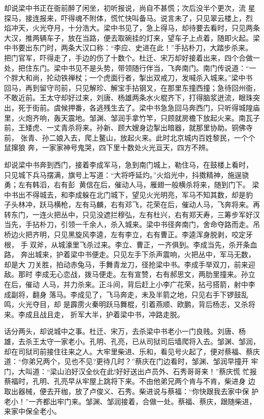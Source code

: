 却说梁中书正在衙前醉了闲坐，初听报说，尚自不甚慌；次后没半个更次，流
星探马，接连报来，吓得魂不附体，慌忙快叫备马。说言未了，只见翠云楼上，烈
焰冲天，火光夺月，十分浩大。梁中书见了，急上得马，却待要去看时，只见两条
大汉，推两辆车子，放在当路，便去取碗挂的灯来，望车子上点着，随即火起。梁
中书要出东门时，两条大汉口称：“李应、史进在此！”手拈朴刀，大踏步杀来。
把门官军，吓得走了，手边的伤了十数个。杜迁、宋万却好接着出来，四个合做一
处，把住东门。梁中书见不是头势，带领随行伴当，飞奔南门。南门传说道：“一
个胖大和尚，抡动铁禅杖；一个虎面行者，掣出双戒刀，发喊杀入城来。”梁中书
回马，再到留守司前，只见解珍、解宝手拈钢叉，在那里东撞西撞；急待回州衙，
不敢近前。王太守却好过来，刘唐、杨雄两条水火棍齐下，打得脑浆迸流，眼珠突
出，死于街前。虞候押番，各逃残生去了。梁中书急急回马奔西门，只听得城隍庙
里，火炮齐响，轰天震地。邹渊、邹润手拿竹竿，只顾就房檐下放起火来。南瓦子
前，王矮虎、一丈青杀将来。孙新、顾大嫂身边掣出暗器，就那里协助。铜佛寺前，
张青、孙二娘入去，爬上鳌山，放起火来。此时北京城内百姓黎民，一个个鼠撺狼
奔，一家家神号鬼哭，四下里十数处火光亘天，四方不辨。

却说梁中书奔到西门，接着李成军马，急到南门城上，勒住马，在鼓楼上看时，
只见城下兵马摆满，旗号上写道：“大将呼延灼。”火焰光中，抖擞精神，施逞骁
勇；左有韩滔，右有彭，黄信在后，催动人马，雁翅一般横杀将来，随到门下。
梁中书出不得城去，和李成躲在北门城下，望见火光明亮，军马不知其数，却是豹
子头林冲，跃马横枪，左有马麟，右有邓飞，花荣在后，催动人马，飞奔将来。再
转东门，一连火把丛中，只见没遮拦穆弘，左有杜兴，右有郑天寿，三筹步军好汉
当先，手拈朴刀，引领一千余人，杀入城来。梁中书径奔南门，舍命夺路而走。吊
桥边火把齐明，只见黑旋风李逵，左有李立，右有曹正。李逵浑身脱剥，咬定牙根，
手双斧，从城濠里飞杀过来。李立、曹正，一齐俱到。李成当先，杀开条血路，
奔出城来，护着梁中书便走。只见左手下杀声震响，火把丛中，军马无数，却是大
刀关胜，拍动赤兔马，手舞青龙刀，径抢梁中书。李成手举双刀，前来迎敌。那时
李成无心恋战，拨马便走。左有宣赞，右有郝思文，两肋里撞来。孙立在后，催动
人马，并力杀来。正斗间，背后赶上小李广花荣，拈弓搭箭，射中李成副将，翻身
落马。李成见了，飞马奔走，未及半箭之地，只见右手下锣鼓乱鸣，火光夺目，却
是霹雳火秦明跃马舞棍，引着燕顺、欧鹏，背后杨志，又杀将来。李成且战且走，
折军大半，护着梁中书，冲路走脱。

话分两头，却说城中之事。杜迁、宋万，去杀梁中书老小一门良贱。刘唐、杨
雄，去杀王太守一家老小。孔明、孔亮，已从司狱司后墙爬将入去。邹渊、邹润，
却在司狱司前接住往来之人。大牢里柴进、乐和，看见号火起了，便对蔡福、蔡庆
道：“你弟兄两个，见也不见?更待几时？”蔡庆在门边看时，邹渊、邹润早撞开
牢门，大叫道：“梁山泊好汉全伙在此!好好送出卢员外、石秀哥哥来！”蔡庆慌
忙报蔡福时，孔明、孔亮早从牢屋上跳将下来。不由他弟兄两个肯与不肯，柴进身
边取出器械，便去开枷，放了卢俊义、石秀。柴进说与蔡福：“你快跟我去家中保
护老小！”一齐都出牢门来。邹渊、邹润接着，合做一处。蔡福、蔡庆，跟随柴进，
来家中保全老小。

